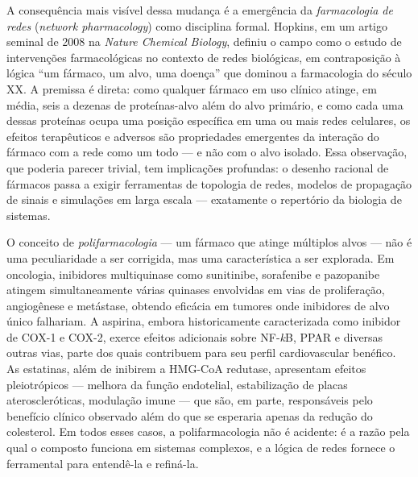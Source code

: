 A consequência mais visível dessa mudança é a emergência da \emph{farmacologia de redes} (\emph{network pharmacology}) como disciplina formal. Hopkins, em um artigo seminal de 2008 na \emph{Nature Chemical Biology}, definiu o campo como o estudo de intervenções farmacológicas no contexto de redes biológicas, em contraposição à lógica ``um fármaco, um alvo, uma doença'' que dominou a farmacologia do século XX. A premissa é direta: como qualquer fármaco em uso clínico atinge, em média, seis a dezenas de proteínas-alvo além do alvo primário, e como cada uma dessas proteínas ocupa uma posição específica em uma ou mais redes celulares, os efeitos terapêuticos e adversos são propriedades emergentes da interação do fármaco com a rede como um todo --- e não com o alvo isolado. Essa observação, que poderia parecer trivial, tem implicações profundas: o desenho racional de fármacos passa a exigir ferramentas de topologia de redes, modelos de propagação de sinais e simulações em larga escala --- exatamente o repertório da biologia de sistemas.

O conceito de \emph{polifarmacologia} --- um fármaco que atinge múltiplos alvos --- não é uma peculiaridade a ser corrigida, mas uma característica a ser explorada. Em oncologia, inibidores multiquinase como sunitinibe, sorafenibe e pazopanibe atingem simultaneamente várias quinases envolvidas em vias de proliferação, angiogênese e metástase, obtendo eficácia em tumores onde inibidores de alvo único falhariam. A aspirina, embora historicamente caracterizada como inibidor de COX-1 e COX-2, exerce efeitos adicionais sobre NF-\emph{k}B, PPAR e diversas outras vias, parte dos quais contribuem para seu perfil cardiovascular benéfico. As estatinas, além de inibirem a HMG-CoA redutase, apresentam efeitos pleiotrópicos --- melhora da função endotelial, estabilização de placas ateroscleróticas, modulação imune --- que são, em parte, responsáveis pelo benefício clínico observado além do que se esperaria apenas da redução do colesterol. Em todos esses casos, a polifarmacologia não é acidente: é a razão pela qual o composto funciona em sistemas complexos, e a lógica de redes fornece o ferramental para entendê-la e refiná-la.

